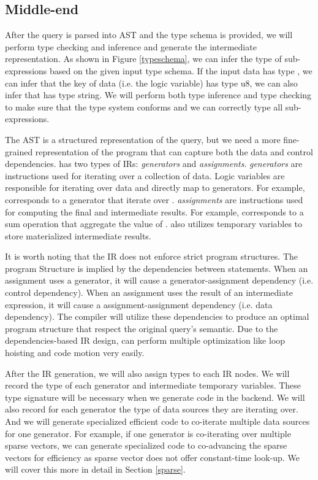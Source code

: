 \documentclass[acmsmall,nonacm]{acmart}\settopmatter{printfolios=true,printccs=false,printacmref=false}
\newcommand{\rhyme}{\text{Rhyme}\xspace}
\begin{document}
\subsection{\rhyme Middle-end}
\iffalse
After the query is parsed into AST and the type schema is provided, we will perform type checking and inference and generate the intermediate representation. As shown in Figure \ref{typeschema}, we can infer the type of sub-expressions based on the given input type schema. If the input data has type , we can infer that the key of data \inline{*} (i.e. the logic variable) has type u8, we can also infer that  has type string. We will perform both type inference and type checking to make sure that the type system conforms and we can correctly type all sub-expressions.\par
The \rhyme AST is a structured representation of the query, but we need a more fine-grained representation of the program that can capture both the data and control dependencies.
\rhyme has two types of IRs: \emph{generators} and \emph{assignments}. \emph{generators} are instructions used for iterating over a collection of data. Logic variables are responsible for iterating over data and directly map to generators. For example,  corresponds to a generator that iterate over . \emph{assignments} are instructions used for computing the final and intermediate results. For example,  corresponds to a sum operation that aggregate the value of .\rhyme also utilizes temporary variables to store materialized intermediate results.\par
It is worth noting that the IR does not enforce strict program structures. The program Structure is implied by the dependencies between statements. When an assignment uses a generator, it will cause a generator-assignment dependency (i.e. control dependency). When an assignment uses the result of an intermediate expression, it will cause a assignment-assignment dependency (i.e. data dependency). The \rhyme compiler will utilize these dependencies to produce an optimal program structure that respect the original query's semantic. Due to the dependencies-based IR design, \rhyme can perform multiple optimization like loop hoisting and code motion very easily.\par
After the IR generation, we will also assign types to each IR nodes. We will record the type of each generator and intermediate temporary variables. These type signature will be necessary when we generate code in the backend. We will also record for each generator the type of data sources they are iterating over. And we will generate specialized efficient code to co-iterate multiple data sources for one generator. For example, if one generator is co-iterating over multiple sparse vectors, we can generate specialized code to co-advancing the sparse vectors for efficiency as sparse vector does not offer constant-time look-up. We will cover this more in detail in Section \ref{sparse}.
\end{document}
